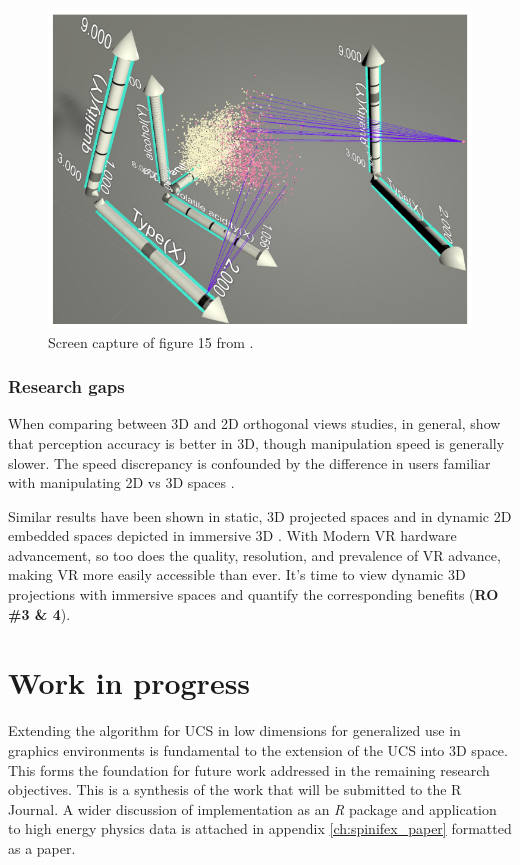 \documentclass{monashthesis}
\begin{document}
\begin{figure}

{\centering \includegraphics[width=0.5\linewidth]{./figures/cordeil2017fig} 

}

\caption{Screen capture of figure 15 from
\textcite{cordeil_imaxes:_2017}.}\label{fig:cordeil2017fig}
\end{figure}

\subsection{Research gaps}\label{research-gaps-1}

When comparing between 3D and 2D orthogonal views studies, in general,
show that perception accuracy is better in 3D, though manipulation speed
is generally slower. The speed discrepancy is confounded by the
difference in users familiar with manipulating 2D vs 3D spaces
\autocites{lee_effects_1986}{wickens_implications_1994}{tory_visualization_2006}[counterexample][]{sedlmair_empirical_2013}.

Similar results have been shown in static, 3D projected spaces
\autocites{gracia_new_2016}{wagner_filho_immersive_2018} and in dynamic
2D embedded spaces depicted in immersive 3D
\autocite{nelson_xgobi_1998}. With Modern VR hardware advancement, so
too does the quality, resolution, and prevalence of VR advance, making
VR more easily accessible than ever. It's time to view dynamic 3D
projections with immersive spaces and quantify the corresponding
benefits (\textbf{RO \#3 \& 4}).

\chapter{Work in progress}\label{ch:workinprogress}

Extending the algorithm for UCS in low dimensions for generalized use in
graphics environments is fundamental to the extension of the UCS into 3D
space. This forms the foundation for future work addressed in the
remaining research objectives. This is a synthesis of the work that will
be submitted to the R Journal. A wider discussion of implementation as
an \emph{R} package and application to high energy physics data
\autocites{wang_visualizing_2018}{cook_dynamical_2018} is attached in
appendix \ref{ch:spinifex_paper} formatted as a paper.
\end{document}
